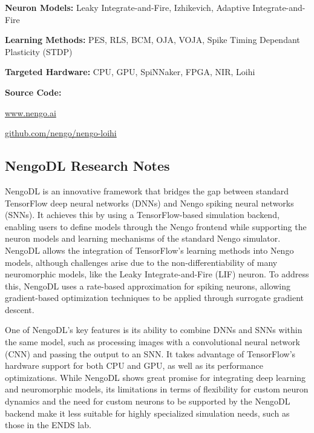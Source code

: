 \begin{tcolorbox}[enhanced,attach boxed title to top center={yshift=-3mm,yshifttext=-1mm}, colback=blue!5!white,colframe=blue!75!black,colbacktitle=red!80!black, title=Nengo at a Glance,fonttitle=\bfseries, boxed title style={size=small,colframe=red!50!black} ]

\textbf{Neuron Models:} Leaky Integrate-and-Fire, Izhikevich, Adaptive Integrate-and-Fire

\textbf{Learning Methods:} PES, RLS, BCM, OJA, VOJA, Spike Timing Dependant Plasticity (STDP)  

\textbf{Targeted Hardware:} CPU, GPU, SpiNNaker, FPGA, NIR, Loihi 

\textbf{Source Code:} 

\href{https://www.nengo.ai}{www.nengo.ai}

\href{https://github.com/nengo/nengo-loihi}{github.com/nengo/nengo-loihi}
\end{tcolorbox}
\subsection*{NengoDL Research Notes}\label{NengoDL}


NengoDL is an innovative framework that bridges the gap between standard TensorFlow deep neural networks (DNNs) and Nengo spiking neural networks (SNNs). It achieves this by using a TensorFlow-based simulation backend, enabling users to define models through the Nengo frontend while supporting the neuron models and learning mechanisms of the standard Nengo simulator. NengoDL allows the integration of TensorFlow's learning methods into Nengo models, although challenges arise due to the non-differentiability of many neuromorphic models, like the Leaky Integrate-and-Fire (LIF) neuron. To address this, NengoDL uses a rate-based approximation for spiking neurons, allowing gradient-based optimization techniques to be applied through surrogate gradient descent.

One of NengoDL's key features is its ability to combine DNNs and SNNs within the same model, such as processing images with a convolutional neural network (CNN) and passing the output to an SNN. It takes advantage of TensorFlow’s hardware support for both CPU and GPU, as well as its performance optimizations. While NengoDL shows great promise for integrating deep learning and neuromorphic models, its limitations in terms of flexibility for custom neuron dynamics and the need for custom neurons to be supported by the NengoDL backend make it less suitable for highly specialized simulation needs, such as those in the ENDS lab.


